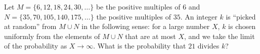 Let $M=\{6,12,18,24,30,\dots\}$ be the positive multiples of $6$ and $N=\{35,70,105,140,175,\dots\}$ the positive multiples of $35$. An integer $k$ is ``picked at random'' from $M\cup N$ in the following sense: for a large number $X$, $k$ is chosen uniformly from the elements of $M\cup N$ that are at most $X$, and we take the limit of the probability as $X\to\infty$. What is the probability that $21$ divides $k$?
